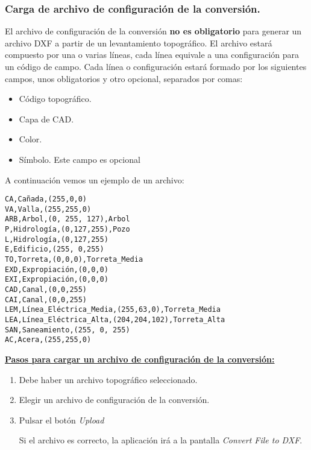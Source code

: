 \subsubsection{Carga de archivo de configuración de la conversión.}

El archivo de configuración de la conversión \textbf{no es obligatorio} para generar un archivo DXF a partir de un levantamiento topográfico. El archivo estará compuesto por una o varias líneas, cada línea equivale a una configuración para un código de campo. Cada línea o configuración estará formado por los siguientes campos, unos obligatorios y otro opcional, separados por comas:

\begin{itemize}
\item Código topográfico.
\item Capa de CAD.
\item Color.
\item Símbolo. Este campo es opcional
\end{itemize}

A continuación vemos un ejemplo de un archivo:

\begin{verbatim}
CA,Cañada,(255,0,0)
VA,Valla,(255,255,0)
ARB,Arbol,(0, 255, 127),Arbol
P,Hidrología,(0,127,255),Pozo
L,Hidrología,(0,127,255)
E,Edificio,(255, 0,255)
TO,Torreta,(0,0,0),Torreta_Media
EXD,Expropiación,(0,0,0)
EXI,Expropiación,(0,0,0)
CAD,Canal,(0,0,255)
CAI,Canal,(0,0,255)
LEM,Línea_Eléctrica_Media,(255,63,0),Torreta_Media
LEA,Línea_Eléctrica_Alta,(204,204,102),Torreta_Alta
SAN,Saneamiento,(255, 0, 255)
AC,Acera,(255,255,0)

\end{verbatim}



\textbf{\underline{Pasos para cargar un archivo de configuración de la conversión:} }

\begin{enumerate}

\item Debe haber un archivo topográfico seleccionado.
\item Elegir un archivo de configuración de la conversión.
\item Pulsar el botón \emph{Upload}

Si el archivo es correcto, la aplicación irá a la pantalla \emph{Convert File to DXF}.

\end{enumerate}

